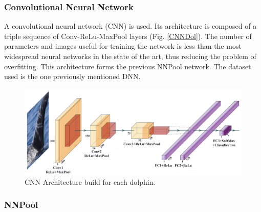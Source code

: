 \subsubsection{Convolutional Neural Network}
A convolutional neural network (CNN) is used. Its architecture is composed 
of a triple sequence of Conv-ReLu-MaxPool layers (Fig. \ref{CNNDol}). The number of 
parameters and images useful for training the network is less than the most 
widespread neural networks in the state of the art, thus reducing the problem 
of overfitting. This architecture forms the previous NNPool network. The 
dataset used is the one previously mentioned DNN.
\begin{figure}[h!]
    \centering
    \includegraphics[width = 0.8\linewidth]{images/paper10/NNPool Architecture.png}
    \centering
    \caption{CNN Architecture build for each dolphin.}
    \label{fig:CNNDol}
\end{figure}

\subsubsection{NNPool}
